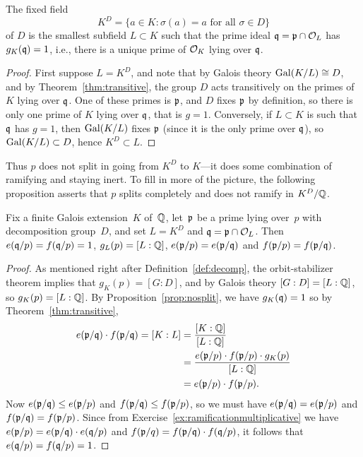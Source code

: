 \begin{proposition}\label{prop:nosplit}
The fixed field
$$K^D=\{a \in K : \sigma(a) = a\text{ for all }
\sigma \in D\}$$
of $D$
is the smallest subfield $L\subset K$ such that
the prime ideal $\mathfrak{q} = \mathfrak{p}\cap\mathcal{O}_L$
has $g_K(\mathfrak{q})=1$, i.e., there is a unique
prime of $\mathcal{O}_K$ lying over $\mathfrak{q}$.
\end{proposition}
\begin{proof}
First suppose $L=K^D$, and note that by Galois theory $\operatorname{Gal}(K/L)\cong
D$, and by Theorem~\ref{thm:transitive}, the group $D$
acts transitively on the primes of $K$ lying over $\mathfrak{q}$.  One of
these primes is $\mathfrak{p}$, and $D$ fixes $\mathfrak{p}$ by definition, so there is
only one prime of $K$ lying over $\mathfrak{q}$, that is $g=1$.
Conversely, if $L\subset K$ is such that $\mathfrak{q}$
has $g=1$, then $\operatorname{Gal}(K/L)$ fixes $\mathfrak{p}$ (since it is the only
prime over $\mathfrak{q}$), so $\operatorname{Gal}(K/L)\subset D$, hence $K^D\subset L$.
\end{proof}

Thus $p$ does not split in going from $K^D$ to $K$---it does some
combination of ramifying and staying inert.  To fill in more of
the picture, the following proposition asserts that $p$ splits
completely and does not ramify in $K^D/\mathbb{Q}$.

\begin{proposition}\label{prop:noresidue}
Fix a finite Galois extension~$K$ of~$\mathbb{Q}$,
let~$\mathfrak{p}$ be a prime lying over~$p$ with decomposition group~$D$,
and set $L=K^D$ and $\mathfrak{q} = \mathfrak{p} \cap \mathcal{O}_L$.
Then $e(\mathfrak{q}/p)=f(\mathfrak{q}/p)=1$, $g_L(p)=[L : \mathbb{Q}]$, $e(\mathfrak{p}/p)=e(\mathfrak{p}/\mathfrak{q})$ and $f(\mathfrak{p}/p)=f(\mathfrak{p}/\mathfrak{q})$.
\end{proposition}
\begin{proof}
As mentioned right after Definition~\ref{def:decomp}, the
orbit-stabilizer theorem implies that $g_K(p)=[G:D]$, and
by Galois theory $[G:D]=[L:\mathbb{Q}]$, so $g_K(p) = [L:\mathbb{Q}]$. By
Proposition~\ref{prop:nosplit}, we have $g_K(\mathfrak{q})=1$ so
by Theorem~\ref{thm:transitive},
\begin{align*}
	e(\mathfrak{p}/\mathfrak{q}) \cdot f(\mathfrak{p}/\mathfrak{q}) = [K:L]
	&=\frac{[K:\mathbb{Q}]}{[L:\mathbb{Q}]} \\
	&= \frac{e(\mathfrak{p}/p)\cdot f(\mathfrak{p}/p) \cdot g_K(p)}{[L:\mathbb{Q}]}
	\\
	&= e(\mathfrak{p}/p)\cdot f(\mathfrak{p}/p).
\end{align*}
Now $e(\mathfrak{p}/\mathfrak{q})\leq e(\mathfrak{p}/p)$ and $f(\mathfrak{p}/\mathfrak{q})\leq f(\mathfrak{p}/p)$, so
we must have $e(\mathfrak{p}/\mathfrak{q})=e(\mathfrak{p}/p)$ and $f(\mathfrak{p}/\mathfrak{q})=f(\mathfrak{p}/p)$.
Since from Exercise~\ref{ex:ramificationmultiplicative} we have
$e(\mathfrak{p}/p)=e(\mathfrak{p}/\mathfrak{q})\cdot e(\mathfrak{q}/p)$ and $f(\mathfrak{p}/q)=f(\mathfrak{p}/\mathfrak{q})\cdot f(\mathfrak{q}/p)$,
it follows that $e(\mathfrak{q}/p)=f(\mathfrak{q}/p) = 1$.
\end{proof}

